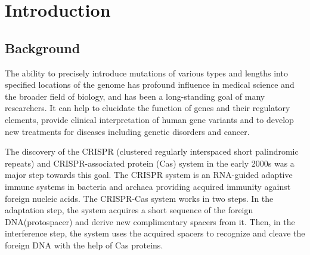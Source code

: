 \chapter{Introduction}

\minitoc

\section{Background}


The ability to precisely introduce mutations of various types and lengths into specified locations of the genome has profound influence in medical science and the broader field of biology, and has been a long-standing goal of many researchers. It can help to elucidate the function of genes and their regulatory elements, provide clinical interpretation of human gene variants and to develop new treatments for diseases including genetic disorders and cancer\cite{petraityteGenomeEditingMedicine2021,dasCRISPRBasedTherapeutics2022,portoBaseEditingAdvances2020}. 

The discovery of the CRISPR (clustered regularly interspaced short palindromic repeats) and CRISPR-associated protein (Cas) system in the early 2000s was a major step towards this goal. The CRISPR system is an RNA-guided adaptive immune systems in bacteria and archaea providing acquired immunity against foreign nucleic acids\cite{jiangCRISPRCas9Structures2017}. The CRISPR-Cas system works in two steps. In the adaptation step, the system acquires a short sequence of the foreign DNA(protospacer) and derive new complimentary spacers from it. Then, in the interference step, the system uses the acquired spacers to recognize and cleave the foreign DNA with the help of Cas proteins\cite{garneauCRISPRCasBacterial2010}. 

